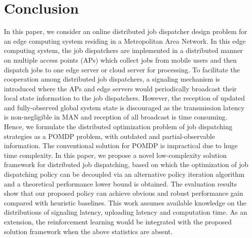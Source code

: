 \section{Conclusion}
\label{sec:conclusion}
In this paper, we consider an online distributed job dispatcher design problem for an edge computing system residing in a Metropolitan Area Network.
In this edge computing system, the job dispatchers are implemented in a distributed manner on multiple access points (APs) which collect jobs from mobile users and then dispatch jobs to one edge server or cloud server for processing.
To facilitate the cooperation among distributed job dispatchers, a signaling mechanism is introduced where the APs and edge servers would periodically broadcast their local state information to the job dispatchers.
However, the reception of updated and fully-observed global system state is discouraged as the transmission latency is non-negligible in MAN and reception of all broadcast is time consuming.
Hence, we formulate the distributed optimization problem of job dispatching strategies as a POMDP problem, with outdated and partial-observable information.
The conventional solution for POMDP is impractical due to huge time complexity.
In this paper, we propose a novel low-complexity solution framework for distributed job dispatching, based on which the optimization of job dispatching policy can be decoupled via an alternative policy iteration algorithm and a theoretical performance lower bound is obtained.
The evaluation results show that our proposed policy can achieve obvious and robust performance gain compared with heuristic baselines.
This work assumes available knowledge on the distributions of signaling latency, uploading latency and computation time.
As an extension, the reinforcement learning would be integrated with the proposed solution framework when the above statistics are absent.
%
